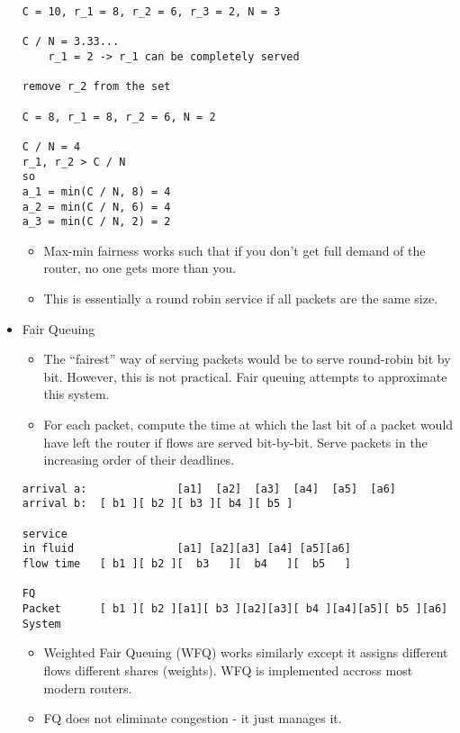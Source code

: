 \documentclass[]{article}
\providecommand{\tightlist}{%
  \setlength{\itemsep}{0pt}\setlength{\parskip}{0pt}}
\begin{document}
\begin{itemize}
\begin{verbatim}
C = 10, r_1 = 8, r_2 = 6, r_3 = 2, N = 3

C / N = 3.33...
    r_1 = 2 -> r_1 can be completely served

remove r_2 from the set

C = 8, r_1 = 8, r_2 = 6, N = 2

C / N = 4
r_1, r_2 > C / N
so 
a_1 = min(C / N, 8) = 4
a_2 = min(C / N, 6) = 4
a_3 = min(C / N, 2) = 2
\end{verbatim}

  \begin{itemize}
  \tightlist
  \item
    Max-min fairness works such that if you don't get full demand of the
    router, no one gets more than you.
  \item
    This is essentially a round robin service if all packets are the
    same size.
  \end{itemize}
\item
  Fair Queuing

  \begin{itemize}
  \tightlist
  \item
    The ``fairest'' way of serving packets would be to serve round-robin
    bit by bit. However, this is not practical. Fair queuing attempts to
    approximate this system.
  \item
    For each packet, compute the time at which the last bit of a packet
    would have left the router if flows are served bit-by-bit. Serve
    packets in the increasing order of their deadlines.
  \end{itemize}

\begin{verbatim}
arrival a:              [a1]  [a2]  [a3]  [a4]  [a5]  [a6]
arrival b:  [ b1 ][ b2 ][ b3 ][ b4 ][ b5 ]

service 
in fluid                [a1] [a2][a3] [a4] [a5][a6]
flow time   [ b1 ][ b2 ][  b3   ][  b4   ][  b5   ]

FQ
Packet      [ b1 ][ b2 ][a1][ b3 ][a2][a3][ b4 ][a4][a5][ b5 ][a6]
System
\end{verbatim}

  \begin{itemize}
  \tightlist
  \item
    Weighted Fair Queuing (WFQ) works similarly except it assigns
    different flows different shares (weights). WFQ is implemented
    accross most modern routers.
  \item
    FQ does not eliminate congestion - it just manages it.


\end{itemize}
\end{itemize}
\end{document}
